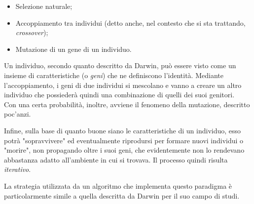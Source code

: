     \begin{itemize}
        \item Selezione naturale;
        \item Accoppiamento tra individui (detto anche, nel contesto che si sta trattando, \textit{crossover});
        \item Mutazione di un gene di un individuo.
    \end{itemize}

    Un individuo, secondo quanto descritto da Darwin, può essere visto come un insieme di caratteristiche (o \textit{geni}) che ne definiscono l'identità. Mediante l'accoppiamento, i geni di due individui si mescolano e vanno a creare un altro individuo che possiederà quindi una combinazione di quelli dei suoi genitori. \\
    Con una certa probabilità, inoltre, avviene il fenomeno della mutazione, descritto poc'anzi.

    Infine, sulla base di quanto buone siano le caratteristiche di un individuo, esso potrà "sopravvivere" ed eventualmente riprodursi per formare nuovi individui o "morire", non propagando oltre i suoi geni, che evidentemente non lo rendevano abbastanza adatto all'ambiente in cui si trovava. Il processo quindi risulta \textit{iterativo}.

    La strategia utilizzata da un algoritmo che implementa questo paradigma è particolarmente simile a quella descritta da Darwin per il suo campo di studi.

